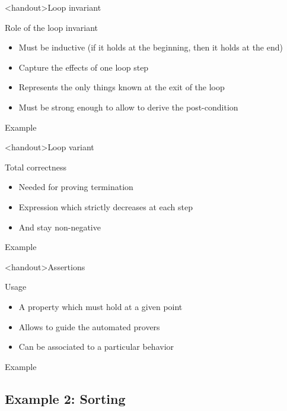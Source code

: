 \documentclass[pdf]{beamer}
\begin{document}
\begin{frame}<handout>{Loop invariant}
\begin{block}{Role of the loop invariant}
\begin{itemize}
\item Must be inductive (if it holds at the beginning, then it holds
  at the end)
\item Capture the effects of one loop step
\item Represents the only things known at the exit of the loop
\item Must be strong enough to allow to derive the post-condition
\end{itemize}
\end{block}
\begin{block}{Example}

\end{block}
\end{frame}

\begin{frame}<handout>{Loop variant}
\begin{block}{Total correctness}
\begin{itemize}
\item Needed for proving termination
\item Expression which strictly decreases at each step
\item And stay non-negative
\end{itemize}
\end{block}
\begin{block}{Example}

\end{block}
\end{frame}

\begin{frame}<handout>{Assertions}
\begin{block}{Usage}
\begin{itemize}
\item A property which must hold at a given point
\item Allows to guide the automated provers
\item Can be associated to a particular behavior
\end{itemize}
\end{block}
\begin{block}{Example}

\end{block}
\end{frame}

\subsection{Example 2: Sorting}
\end{document}
